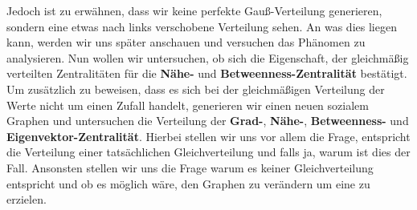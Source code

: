 Jedoch ist zu erwähnen, dass wir keine perfekte Gauß-Verteilung generieren, sondern eine etwas nach links verschobene Verteilung sehen. An was dies liegen kann, werden wir uns später anschauen und versuchen das Phänomen zu analysieren. Nun wollen wir untersuchen, ob sich die Eigenschaft, der gleichmäßig verteilten Zentralitäten für die \textbf{Nähe-} und \textbf{Betweenness-Zentralität} bestätigt. Um zusätzlich zu beweisen, dass es sich bei der gleichmäßigen Verteilung der Werte nicht um einen Zufall handelt, generieren wir einen neuen sozialem Graphen und untersuchen die Verteilung der \textbf{Grad-}, \textbf{Nähe-}, \textbf{Betweenness-} und \textbf{Eigenvektor-Zentralität}. Hierbei stellen wir uns vor allem die Frage, entspricht die Verteilung einer tatsächlichen Gleichverteilung und falls ja, warum ist dies der Fall. Ansonsten stellen wir uns die Frage warum es keiner Gleichverteilung entspricht und ob es möglich wäre, den Graphen zu verändern um eine zu erzielen.

